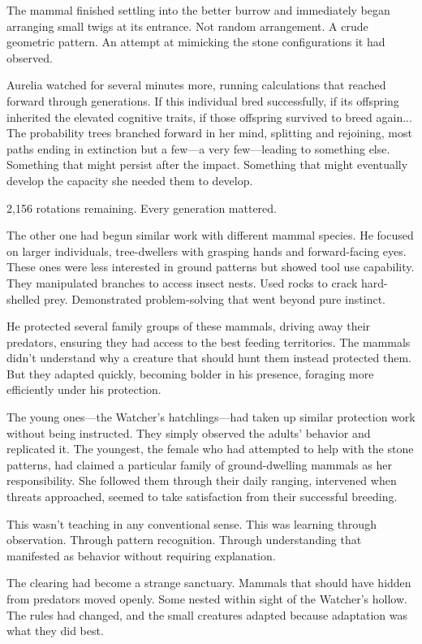 The mammal finished settling into the better burrow and immediately began arranging small twigs at its entrance. Not random arrangement. A crude geometric pattern. An attempt at mimicking the stone configurations it had observed.

Aurelia watched for several minutes more, running calculations that reached forward through generations. If this individual bred successfully, if its offspring inherited the elevated cognitive traits, if those offspring survived to breed again... The probability trees branched forward in her mind, splitting and rejoining, most paths ending in extinction but a few—a very few—leading to something else. Something that might persist after the impact. Something that might eventually develop the capacity she needed them to develop.

2,156 rotations remaining. Every generation mattered.

\scenebreak

The other one had begun similar work with different mammal species. He focused on larger individuals, tree-dwellers with grasping hands and forward-facing eyes. These ones were less interested in ground patterns but showed tool use capability. They manipulated branches to access insect nests. Used rocks to crack hard-shelled prey. Demonstrated problem-solving that went beyond pure instinct.

He protected several family groups of these mammals, driving away their predators, ensuring they had access to the best feeding territories. The mammals didn't understand why a creature that should hunt them instead protected them. But they adapted quickly, becoming bolder in his presence, foraging more efficiently under his protection.

The young ones—the Watcher's hatchlings—had taken up similar protection work without being instructed. They simply observed the adults' behavior and replicated it. The youngest, the female who had attempted to help with the stone patterns, had claimed a particular family of ground-dwelling mammals as her responsibility. She followed them through their daily ranging, intervened when threats approached, seemed to take satisfaction from their successful breeding.

This wasn't teaching in any conventional sense. This was learning through observation. Through pattern recognition. Through understanding that manifested as behavior without requiring explanation.

The clearing had become a strange sanctuary. Mammals that should have hidden from predators moved openly. Some nested within sight of the Watcher's hollow. The rules had changed, and the small creatures adapted because adaptation was what they did best.

